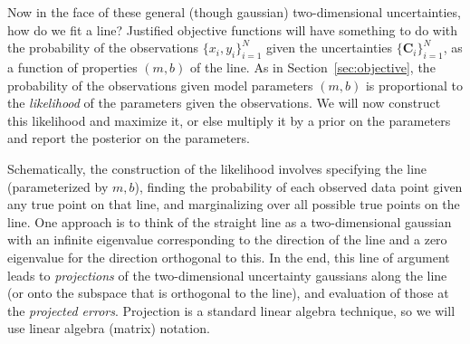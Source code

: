 \documentclass[12pt,twoside]{article}
\newcommand{\sectionname}{Section}
\newcommand{\mmatrix}[1]{\boldsymbol{#1}}
\newcommand{\mC}{\mmatrix{C}}
\newcommand{\setofall}[3]{\{{#1}\}_{{#2}}^{{#3}}}
\newcommand{\allxy}{\setofall{x_i,y_i}{i=1}{N}}
\newcommand{\allC}{\setofall{\mC_i}{i=1}{N}}
\begin{document}
Now in the face of these general (though gaussian) two-dimensional
uncertainties, how do we fit a line?  Justified objective functions
will have something to do with the probability of the observations
$\allxy$ given the uncertainties $\allC$, as a function of properties
$(m,b)$ of the line.  As in \sectionname~\ref{sec:objective}, the
probability of the observations given model parameters $(m,b)$ is
proportional to the \emph{likelihood} of the parameters given the
observations.  We will now construct this likelihood and maximize it,
or else multiply it by a prior on the parameters and report the
posterior on the parameters.

Schematically, the construction of the likelihood involves specifying
the line (parameterized by $m,b$), finding the probability of each
observed data point given any true point on that line, and
marginalizing over all possible true points on the line.  One approach
is to think of the straight line as a two-dimensional gaussian with an
infinite eigenvalue corresponding to the direction of the line and a
zero eigenvalue for the direction orthogonal to this. In the end, this
line of argument leads to \emph{projections} of the two-dimensional
uncertainty gaussians along the line (or onto the subspace that is
orthogonal to the line), and evaluation of those at the
\emph{projected errors}.  Projection is a standard linear algebra
technique, so we will use linear algebra (matrix) notation.
\end{document}
